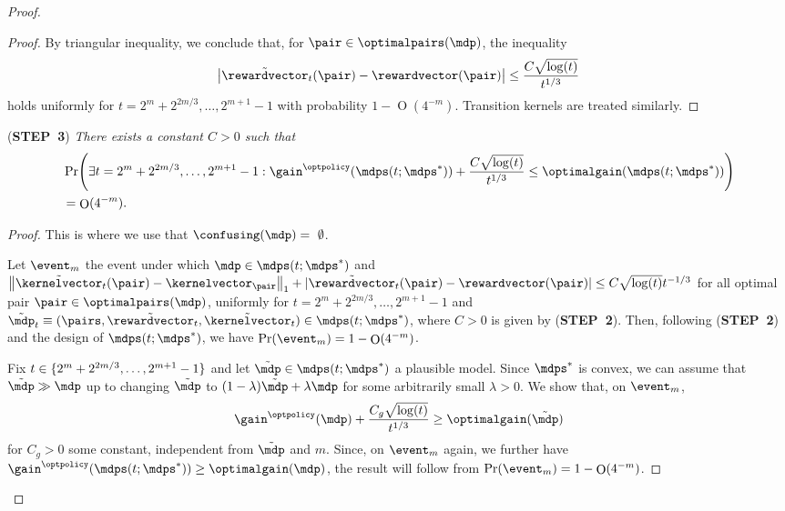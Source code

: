 \documentclass[preprint,cleveref,12pt]{colt2025}
\DeclarePairedDelimiter{\braces}{\{}{\}}	%
\DeclarePairedDelimiter{\parens}{(}{)}	%
\DeclarePairedDelimiter{\abs}{\lvert}{\rvert}	%
\DeclarePairedDelimiter{\norm}{\lVert}{\rVert}	%
\DeclareMathOperator*{\OH}{\mathrm{O}}
\def\model{\mdp}
\def\models{\mdps}
\def\kernel{\kernelvector}
\def\reward{\rewardvector}
\def\optpairs{\optimalpairs}
\def\optgain{\optimalgain} %
\def\STEP#1{(\strong{STEP~#1})}
\newcommand{\strong}[1]{\textbf{#1}}
\begin{document}
\begin{proof}
\begin{proof}
            By triangular inequality, we conclude that, for $\pair \in \optpairs(\model)$, the inequality
            \begin{equation*}
                \abs*{\tilde{\reward}_t(\pair) - \reward(\pair)} 
                \le 
                \frac{C \sqrt{\log(t)}}{t^{1/3}}
            \end{equation*}
            holds uniformly for $t =2^m + 2^{2m/3}, \ldots, 2^{m+1}-1$ with probability $1 - \OH(4^{-m})$. 
            Transition kernels are treated similarly. 
        \end{proof}

        \noindent
        \STEP{3}
        \textit{
            There exists a constant $C > 0$ such that
            \begin{align*}
                & 
                \Pr \parens*{
                    \exists t =2^m + 2^{2m/3}, \ldots, 2^{m+1}-1
                    :
                    \gain^{\optpolicy}(\models(t; \models^*))
                    +
                    \frac{C \sqrt{\log(t)}}{t^{1/3}}
                    \le
                    \optgain(\models(t; \models^*))
                }
                \\
                & = \OH(4^{-m})
                .
            \end{align*}
        }
        \begin{proof}
            This is where we use that $\confusing(\model) = \emptyset$.

            Let $\event_m$ the event under which $\model \in \models(t; \models^*)$ and $\norm*{\tilde{\kernel}_t(\pair) - \kernel_\pair}_1 + \abs{\tilde{\reward}_t(\pair) - \reward(\pair)} \le C \sqrt{\log(t)}{t^{-1/3}}$ for all optimal pair $\pair \in \optpairs(\model)$, uniformly for $t = 2^{m} + 2^{2m/3}, \ldots, 2^{m+1}-1$ and $\tilde{\model}_t \equiv (\pairs, \tilde{\reward}_t, \tilde{\kernel}_t) \in \models(t; \models^*)$, where $C > 0$ is given by \STEP{2}.
            Then, following \STEP{2} and the design of $\models(t; \models^*)$, we have $\Pr(\event_m) = 1 - \OH(4^{-m})$. 

            Fix $t \in \braces{2^m + 2^{2m/3}, \ldots, 2^{m+1}-1}$ and let $\tilde{\model} \in \models(t; \models^*)$ a plausible model. 
            Since $\models^*$ is convex, we can assume that $\tilde{\model} \gg \model$ up to changing $\tilde{\model}$ to $(1 - \lambda) \tilde{\model} + \lambda \model$ for some arbitrarily small $\lambda > 0$. 
            We show that, on $\event_m$, 
            \begin{equation}
            \label{equation_proof_confusing_non_explorative_1_5}
                \gain^{\optpolicy}(\model) 
                + 
                \frac{C_g\sqrt{\log(t)}}{t^{1/3}}
                \ge 
                \optgain(\tilde{\model}) 
            \end{equation}
            for $C_g > 0$ some constant, independent from $\tilde{\model}$ and $m$. 
            Since, on $\event_m$ again, we further have $\gain^{\optpolicy}(\models(t; \models^*)) \ge \optgain(\model)$, the result will follow from $\Pr(\event_m) = 1 - \OH(4^{-m})$. 


\end{proof}
\end{proof}
\end{document}

